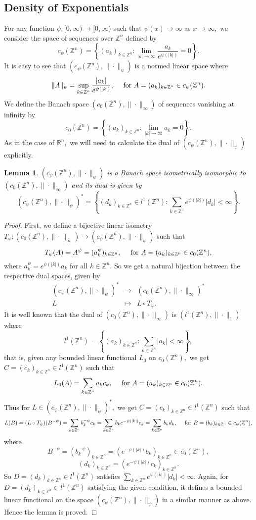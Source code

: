 \documentclass [11pt]{amsart}
\newtheorem{Lem}{Lemma}[section]
\newcommand{\R}{\mathbb R}
\newcommand{\Z}{\mathbb Z}
\newcommand{\txt} {\textmd}
\newcommand{\ds} {\displaystyle}
\newcommand{\bes} {\begin{equation*}}
\newcommand{\ees} {\end{equation*}}
\newcommand{\beas} {\begin{eqnarray*}}
\newcommand{\eeas} {\end{eqnarray*}}
\numberwithin{equation}{section}
\begin{document}
\subsection{Density of Exponentials}

For any function $\psi:[0,\infty) \rightarrow [0,\infty)$ such that $\psi(x)\to \infty $ as $x\to \infty,$ we consider the space of sequences over $\Z^n$ defined by $$c_{\psi}(\Z^n)=\left\lbrace (a_k)_{k\in \Z^n} : \lim_{|k|\to \infty}\dfrac{a_k}{e^{\psi(|k|)}}=0\right\rbrace .$$ It is easy to see that $(c_{\psi}(\Z^n),\|\cdot \|_{\psi})$ is a normed linear space where 
$$\|A\|_{\psi}=\sup_{k\in\Z^n}\dfrac{|a_k|}{e^{\psi(|k|)}}, \quad \txt{ for } A=(a_k)_{k\in \Z^n}\in c_{\psi}(\Z^n).$$ 
We define the Banach space $(c_0(\Z^n),\|\cdot\|_{\infty})$ of sequences vanishing at infinity by 
$$ c_0(\Z^n)=\ds{\left\lbrace (a_k)_{k\in\Z^n} : \lim_{|k|\to \infty}a_k=0 \right\rbrace }.$$
As in the case of $\R^n,$ we will need to calculate the dual of $(c_{\psi}(\Z^n),\|\cdot \|_{\psi})$ explicitly. 

\begin{Lem}\label{dual-lem-c}
	$(c_{\psi}(\Z^n),\|\cdot\|_{\psi})$ is a Banach space isometrically isomorphic to $(c_0(\Z^n),\|\cdot\|_{\infty})$ and its dual is given by
	$$(c_{\psi}(\Z^n),\|\cdot\|_{\psi})^*=\left\lbrace (d_k)_{k\in \Z^n} \in l^1( \Z^n) :
	\sum_{k\in\Z^n}e^{\psi(|k|)}|d_k|<\infty \right\rbrace .$$
\end{Lem}
\begin{proof}
First, we define a bijective linear isometry $T_\psi: (c_0(\Z^n),\|\cdot\|_{\infty}) \to (c_{\psi}(\Z^n),\|\cdot\|_{\psi})$ such that 
$$T_\psi(A) = A^\psi = (a^\psi_k)_{k\in\Z^n}, \quad \txt{ for } A = (a_k)_{k\in\Z^n} \in c_0(\Z^n),$$ 
where $a^\psi_k=e^{\psi(|k|)}a_k$ for all $k\in \Z^n.$ So we get a natural bijection between the respective dual spaces, given by 
\beas 
(c_{\psi}(\Z^n),\|\cdot\|_{\psi})^* &\to & (c_0(\Z^n),\|\cdot\|_{\infty})^* \\
L & \mapsto & L \circ T_\psi.
\eeas
It is well known that the dual of $(c_0(\Z^n),\|\cdot\|_{\infty}) $ is $(l^1(\Z^n),\|\cdot\|_{1})$ where
$$ l^1(\Z^n)=\left\{ (a_k)_{k\in\Z^n} : \sum_{k\in\Z^n}|a_k|<\infty \right\},$$
that is, given any bounded linear functional $L_0$ on $c_0(\Z^n),$ we get $C=(c_k)_{k\in\Z^n}\in l^1( \Z^n)$ such that 
\bes L_0(A)=\sum_{k\in\Z^n}a_kc_k, \quad \txt{ for } A=(a_k)_{k\in\Z^n}\in c_0(\Z^n).\ees
Thus for $L\in (c_{\psi}(\Z^n),\|\cdot\|_{\psi})^*,$ we get $C=(c_k)_{k\in\Z^n}\in l^1(\Z^n)$ such that 
\bes 
L(B)=(L\circ T_\psi)(B^{-\psi})=\sum_{k\in \Z^n}b^{-\psi}_kc_k =\sum_{k\in\Z^n}b_k e^{-\psi(|k|)} c_k = \sum_{k\in\Z^n}b_k d_k, \quad \txt{ for } B=(b_k)_{k\in\Z^n}\in c_\psi(\Z^n),
\ees
where $$B^{-\psi}=(b^{-\psi}_k)_{k\in\Z^n} = (e^{-\psi(|k|)}b_k)_{k\in\Z^n} \in c_0(\Z^n),$$
$$(d_k)_{k\in\Z^n} = (e^{-\psi(|k|)}c_k)_{k\in\Z^n}.$$ So $D =(d_k)_{k\in\Z^n} \in l^1( \Z^n)$ satisfies $\ds{\sum_{k\in\Z^n}e^{\psi(|k|)}|d_k|<\infty.}$ Again, for $D=(d_k)_{k\in\Z^n} \in l^1(\Z^n)$ satisfying the given condition, it defines a bounded linear functional on the space $(c_\psi( \Z^n), \|\cdot\|_{\psi})$ in a similar manner as above. Hence the lemma is proved.	
\end{proof}
\end{document}
